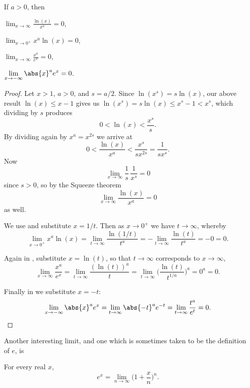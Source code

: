 \begin{theorem}
	If $a > 0$, then
	\begin{romanlist}
		\item $\displaystyle \lim_{x \to \infty} \frac{\ln(x)}{x^a} = 0$,
		\item $\displaystyle \lim_{x \to 0^+} x^a \ln(x) = 0$,
		\item $\displaystyle \lim_{x \to \infty} \frac{x^a}{e^x} = 0$,
		\item $\displaystyle \lim_{x \to -\infty} \abs{x}^a e^x = 0$.
	\end{romanlist}
\end{theorem}

\begin{proof}
	 Let $x > 1$, $a > 0$, and $s = a / 2$. Since $\ln(x^s) = s \ln(x)$, our above result $\ln(x) \leq x - 1$ gives us $\ln(x^s) = s \ln(x) \leq x^s - 1 < x^s$, which dividing by $s$ produces
	\[
		0 < \ln(x) < \frac{x^s}{s}.
	\]
	By dividing again by $x^a = x^{2 s}$ we arrive at
	\[
		0 < \frac{\ln(x)}{x^a} < \frac{x^s}{s x^{2 s}} = \frac{1}{s x^s}.
	\]
	Now
	\[
		\lim_{x \to \infty} \frac{1}{s} \, \frac{1}{x^s} = 0
	\]
	since $s > 0$, so by the Squeeze theorem
	\[
		\lim_{x \to \infty} \frac{\ln(x)}{x^a} = 0
	\]
	as well.

	 We use  and substitute $x = 1/t$. Then as $x \to 0^+$ we have $t \to \infty$, whereby
	\[
		\lim_{x \to 0^+} x^a \ln(x) = \lim_{t \to \infty} \frac{\ln(1 / t)}{t^a} = - \lim_{t \to \infty} \frac{\ln(t)}{t^a} = -0 = 0.
	\]

	\noindent
	 Again in , substitute $x = \ln(t)$, so that $t \to \infty$ corresponds to $x \to \infty$,
	\[
		\lim_{x \to \infty} \frac{x^a}{e^x} = \lim_{t \to \infty} \frac{(\ln(t))^a}{t} = \lim_{t \to \infty} \Big ( \frac{\ln(t)}{t^{1/a}} \Big ) ^a = 0^a = 0.
	\]

	\noindent
	 Finally in  we substitute $x = -t$:
	\[
		\lim_{x \to -\infty} \abs{x}^a e^x = \lim_{t \to \infty} \abs{- t}^a e^{-t} = \lim_{t \to \infty} \frac{t^a}{e^t} = 0. \qedhere
	\]
\end{proof}

\noindent
Another interesting limit, and one which is sometimes taken to be the definition of $e$, is
\begin{theorem}
	For every real $x$,
	\[
		e^x = \lim_{n \to \infty} \Big ( 1 + \frac{x}{n} \Big )^n.
	\]
\end{theorem}


